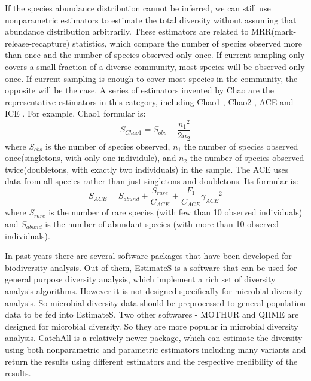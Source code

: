 If the species abundance distribution cannot be inferred, we can still use
nonparametric estimators to estimate the total diversity without assuming that
abundance distribution arbitrarily. These estimators are related to
MRR(mark-release-recapture) statistics, which compare the number of species
observed more than once and the number of species observed only once. If
current sampling only covers a small fraction of a diverse community, most
species will be observed only once. If current sampling is enough to cover most
species in the community, the opposite will be the case. A series of estimators
invented by Chao are the representative estimators in this category, including
Chao1 \cite{chao1984nonparametric}, Chao2 \cite{Chao:1987aa}, ACE
\cite{chao1993stopping} and ICE \cite{lee1994estimating}. For example, Chao1
formular is:\\ $${S}_{Chao1}={S}_{obs}+\frac{{{n}_{1}}^{2}}{2{n}_{2}}$$ where
${S}_{obs}$ is the number of species observed, ${n}_{1}$ the number of species
observed once(singletons, with only one individule), and ${n}_{2}$ the number
of species observed twice(doubletons, with exactly two individuals) in the
sample. The ACE uses data from all species rather than just singletons and
doubletons. Its formular is:\\
$${S}_{ACE}={S}_{abund}+\frac{{S}_{rare}}{{C}_{ACE}}+\frac{{F}_{1}}{{C}_{ACE}}{
{\gamma }_{ACE}}^{2}$$ where ${S}_{rare}$ is the number of rare species (with
few than 10 observed individuals) and ${S}_{abund}$ is the number of abundant
species (with more than 10 observed individuals).

In past years there are several software packages that have been developed for
biodiversity analysis. Out of them, EstimateS \cite{colwellestimates} is a
software that can be used for general purpose diversity analysis, which
implement a rich set of diversity analysis algorithms. However it is not
designed specifically for microbial diversity analysis. So microbial diversity
data should be preprocessed to general population data to be fed into
EstimateS. Two other softwares - MOTHUR \cite{Schloss:2009aa} and QIIME
\cite{Caporaso:2010aa} are designed for microbial diversity. So they are more
popular in microbial diversity analysis. CatchAll \cite{Bunge:2011aa} is a
relatively newer package, which can estimate the diversity using both
nonparametric and parametric estimators including many variants and return the
results using different estimators and the respective credibility of the
results.


